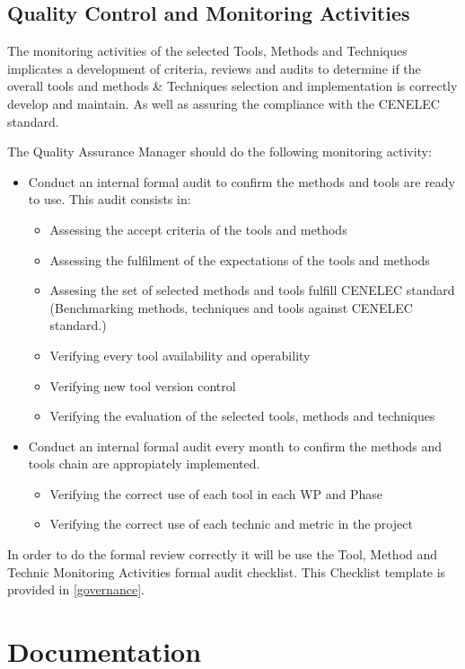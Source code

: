 \documentclass{template/openetcs_article}
\begin{document}
\subsection{Quality Control and Monitoring Activities}
The monitoring activities of the selected Tools, Methods and Techniques implicates a development of criteria, reviews and audits to determine if the overall tools and methods \& Techniques selection and implementation is correctly develop and maintain. As well as assuring the compliance with the CENELEC standard.

The Quality Assurance Manager should do the following monitoring activity:
\begin{itemize}
\item Conduct an internal formal audit to confirm the methods and tools are ready to use. This audit consists in:
\begin{itemize}
\item Assessing the accept criteria of the tools and methods
\item Assessing the fulfilment of the expectations of the tools and methods
\item Assesing the set of selected methods and tools fulfill CENELEC standard (Benchmarking methods, techniques and tools against CENELEC standard.)
\item Verifying every tool availability and operability
\item Verifying new tool version control
\item Verifying the evaluation of the selected tools, methods and techniques
\end{itemize}
\item Conduct an internal formal audit every month to confirm the methods and tools chain are appropiately implemented. 
\begin{itemize}
\item Verifying the correct use of each tool in each WP and Phase
\item Verifying the correct use of each technic and metric in the project
\end{itemize}
\end{itemize}

In order to do the formal review correctly it will be use the Tool, Method and Technic Monitoring Activities formal audit checklist. This Checklist template is provided in \href{https://github.com/openETCS/governance/tree/master/Templates}{[governance]}.

\section{Documentation}
\end{document}

